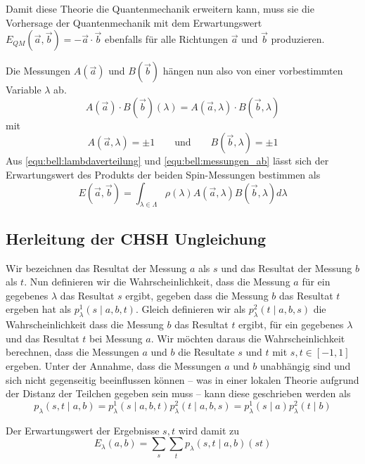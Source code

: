 \begin{refsection}
Damit diese Theorie die Quantenmechanik erweitern kann, muss sie die Vorhersage
der Quantenmechanik mit dem Erwartungswert 
$E_{QM}(\vec{a},\vec{b}) = -\vec{a}\cdot\vec{b}$
ebenfalls f\"ur alle Richtungen $\vec{a}$ und $\vec{b}$ produzieren.

Die Messungen $A(\vec{a})$ und $B(\vec{b})$ h\"angen nun also von einer
vorbestimmten Variable $\lambda$ ab.
\begin{equation}\label{equ:bell:messungen_ab}
    A(\vec{a}) \cdot B(\vec{b})(\lambda) = A(\vec{a},\lambda) \cdot B(\vec{b},\lambda)
\end{equation}
mit
\[
    A(\vec{a},\lambda) = \pm 1 \qquad \text{und} \qquad B(\vec{b},\lambda) = \pm 1
\]
Aus \eqref{equ:bell:lambdaverteilung} und \eqref{equ:bell:messungen_ab}
l\"asst sich der Erwartungswert des Produkts der beiden Spin-Messungen
bestimmen als
\begin{equation}
    E(\vec{a},\vec{b}) = \int_{\lambda\in\Lambda} 
    \rho(\lambda) A(\vec{a},\lambda) B(\vec{b},\lambda) d\lambda
\end{equation}




\subsection{Herleitung der CHSH Ungleichung}
Wir bezeichnen das Resultat der Messung $a$ als $s$ und das Resultat
der Messung $b$ als $t$.
Nun definieren wir die Wahrscheinlichkeit, dass die Messung $a$ f\"ur ein
gegebenes $\lambda$ das Resultat $s$ ergibt, gegeben dass die Messung $b$ das
Resultat $t$ ergeben hat als $p_{\lambda}^1(s \mid a,b,t)$.
Gleich definieren wir als $p_{\lambda}^2(t \mid a,b,s)$ die Wahrscheinlichkeit
dass die Messung $b$ das Resultat $t$ ergibt, f\"ur ein gegebenes $\lambda$ und
das Resultat $t$ bei Messung $a$. 
Wir m\"ochten daraus die Wahrscheinlichkeit berechnen, dass die Messungen
$a$ und $b$ die Resultate $s$ und $t$ mit $s,t \in [-1,1]$ ergeben. 
Unter der Annahme, dass die Messungen $a$ und $b$ unabh\"angig sind und sich
nicht gegenseitig beeinflussen k\"onnen -- was in einer lokalen Theorie
aufgrund der Distanz der Teilchen gegeben sein muss -- kann diese geschrieben
werden als
\begin{equation}
    p_{\lambda}(s,t \mid a,b) 
    = p_{\lambda}^1(s \mid a,b,t) p_{\lambda}^2(t \mid a,b,s)
    = p_{\lambda}^1(s \mid a) p_{\lambda}^2(t \mid b)
    \label{equ:bell:wkeit}
\end{equation}

Der Erwartungswert der Ergebnisse $s,t$ wird damit zu
\begin{equation}
    E_{\lambda}(a,b) = \sum_s \sum_t p_{\lambda}(s,t \mid a,b) (st)
    \label{equ:bell:erwartungswert}
\end{equation}


\end{refsection}
